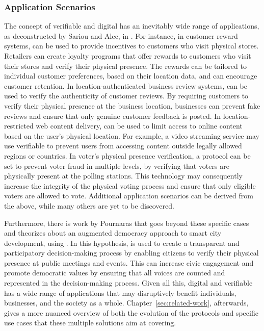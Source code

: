 \subsubsection{Application Scenarios}
\label{sec:background-proof-of-location-application-scenarios}

The concept of verifiable and digital \pol{} has an inevitably wide range of applications, as deconstructed by Sariou and Alec, in \cite{saroiu2009enabling}. For instance, in customer reward systems, \pol{} can be used to provide incentives to customers who visit physical stores. Retailers can create loyalty programs that offer rewards to customers who visit their stores and verify their physical presence. The rewards can be tailored to individual customer preferences, based on their location data, and can encourage customer retention. In location-authenticated business review systems, \pol{} can be used to verify the authenticity of customer reviews. By requiring customers to verify their physical presence at the business location, businesses can prevent fake reviews and ensure that only genuine customer feedback is posted. In location-restricted web content delivery, \pol{} can be used to limit access to online content based on the user's physical location. For example, a video streaming service may use verifiable \pol{} to prevent users from accessing content outside legally allowed regions or countries. In voter's physical presence verification, a \pol{} protocol can be set to prevent voter fraud in multiple levels, by verifying that voters are physically present at the polling stations. This technology may consequently increase the integrity of the physical voting process and ensure that only eligible voters are allowed to vote. Additional application scenarios can be derived from the above, while many others are yet to be discovered.

Furthermore, there is work by Pournaras \cite{pournaras2020proof} that goes beyond these specific cases and theorizes about an augmented democracy approach to smart city development, using \pol{}. In this hypothesis, \pol{} is used to create a transparent and participatory decision-making process by enabling citizens to verify their physical presence at public meetings and events. This can increase civic engagement and promote democratic values by ensuring that all voices are counted and represented in the decision-making process. Given all this, digital and verifiable \pol{} has a wide range of applications that may disruptively benefit individuals, businesses, and the society as a whole. Chapter~\ref{sec:related-work}, afterwards, gives a more nuanced overview of both the evolution of the protocols and specific use cases that these multiple solutions aim at covering.